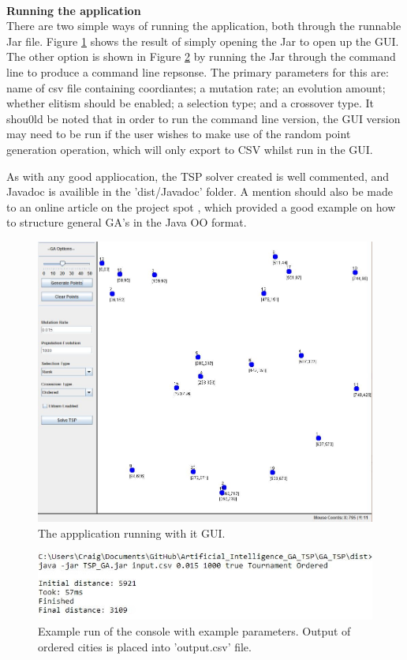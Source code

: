 \documentclass[article]{IEEEtran}
\begin{document}
\\
\appendix

\textbf{Running the application}\\
There are two simple ways of running the application, both through the runnable Jar file. Figure \ref{fig:6} shows the result of simply opening the Jar to open up the GUI. The other option is shown in Figure \ref{fig:7} by running the Jar through the command line to produce a command line repsonse. The primary parameters for this are: name of csv file containing coordiantes; a mutation rate; an evolution amount; whether elitism should be enabled; a selection type; and a crossover type. It shou0ld be noted that in order to run the command line version, the GUI version may need to be run if the user wishes to make use of the random point generation operation, which will only export to CSV whilst run in the GUI. \par
As with any good appliocation, the TSP solver created is well commented, and Javadoc is availible in the 'dist/Javadoc' folder. A mention should also be made to an online article on the project spot \cite{13}, which provided a good example on how to structure general GA's in the Java OO format.

\begin{figure}[H]
\centering
  \includegraphics[width=.8\linewidth]{images/GUI}
  \caption{The appplication running with it GUI.}
  \label{fig:6}
\end{figure}

\begin{figure}[H]
\centering
  \includegraphics[width=.9\linewidth]{images/commandLine}
  \caption{Example run of the console with example parameters. Output of ordered cities is placed into 'output.csv' file.}
  \label{fig:7}
\end{figure}
\end{document}
